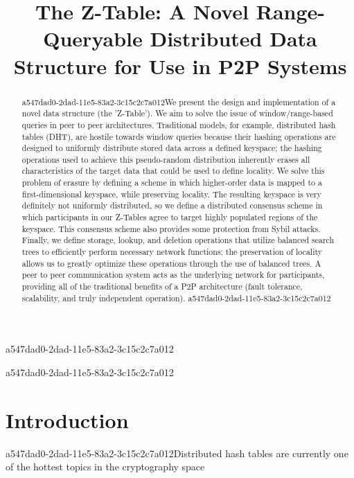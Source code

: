 \documentclass[12pt]{article}
\title{The Z-Table: A Novel Range-Queryable Distributed Data Structure for Use in P2P Systems}
\begin{document}
a547dad0-2dad-11e5-83a2-3c15c2c7a012
\maketitle

\begin{abstract}
a547dad0-2dad-11e5-83a2-3c15c2c7a012We present the design and implementation of a novel data structure (the 'Z-Table'). We aim to solve the issue of window/range-based queries in peer to peer architectures. Traditional models, for example,  distributed hash tables (DHT), are hostile towards window queries because their hashing operations are designed to uniformly distribute stored data across a defined keyspace; the hashing operations used to achieve this pseudo-random distribution inherently erases all characteristics of the target data that could be used to define locality. We solve this problem of erasure by defining a scheme in which higher-order data is mapped to a first-dimensional keyspace, while preserving locality. The resulting keyspace is very definitely not uniformly distributed, so we define a distributed consensus scheme in which participants in our Z-Tables agree to target highly populated regions of the keyspace. This consensus scheme also provides some protection from Sybil attacks. Finally, we define storage, lookup, and deletion operations that utilize balanced search trees to efficiently perform necessary network functions; the preservation of locality allows us to greatly optimize these operations through the use of balanced trees. A peer to peer communication system acts as the underlying network for participants, providing all of the traditional benefits of a P2P architecture (fault tolerance, scalability, and truly independent operation).
a547dad0-2dad-11e5-83a2-3c15c2c7a012\end{abstract}


\newpage
a547dad0-2dad-11e5-83a2-3c15c2c7a012\section{Introduction}
a547dad0-2dad-11e5-83a2-3c15c2c7a012Distributed hash tables are currently one of the hottest topics in the cryptography space~\cite{Stoica:2001dj,Rowstron:2001ea,Ratnasamy:2001wn}

\printbibliography
\end{document}
